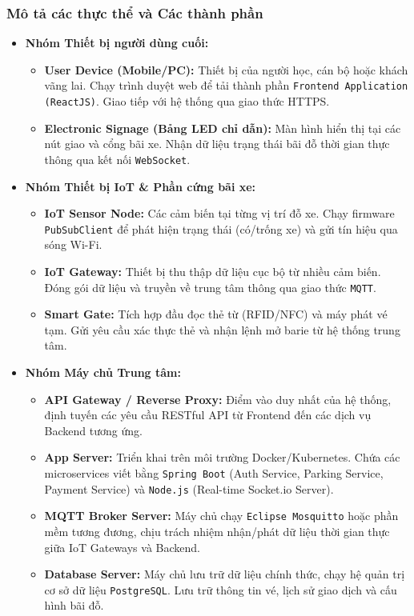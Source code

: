 \subsubsection{Mô tả các thực thể và Các thành phần}

\begin{itemize}
    \item \textbf{Nhóm Thiết bị người dùng cuối:}
    \begin{itemize}
        \item \textbf{User Device (Mobile/PC):} Thiết bị của người học, cán bộ hoặc khách vãng lai. Chạy trình duyệt web để tải thành phần \texttt{Frontend Application (ReactJS)}. Giao tiếp với hệ thống qua giao thức HTTPS.
        \item \textbf{Electronic Signage (Bảng LED chỉ dẫn):} Màn hình hiển thị tại các nút giao và cổng bãi xe. Nhận dữ liệu trạng thái bãi đỗ thời gian thực thông qua kết nối \texttt{WebSocket}.
    \end{itemize}

    \item \textbf{Nhóm Thiết bị IoT \& Phần cứng bãi xe:}
    \begin{itemize}
        \item \textbf{IoT Sensor Node:} Các cảm biến tại từng vị trí đỗ xe. Chạy firmware \texttt{PubSubClient} để phát hiện trạng thái (có/trống xe) và gửi tín hiệu qua sóng Wi-Fi.
        \item \textbf{IoT Gateway:} Thiết bị thu thập dữ liệu cục bộ từ nhiều cảm biến. Đóng gói dữ liệu và truyền về trung tâm thông qua giao thức \texttt{MQTT}.
        \item \textbf{Smart Gate:} Tích hợp đầu đọc thẻ từ (RFID/NFC) và máy phát vé tạm. Gửi yêu cầu xác thực thẻ và nhận lệnh mở barie từ hệ thống trung tâm.
    \end{itemize}

    \item \textbf{Nhóm Máy chủ Trung tâm:}
    \begin{itemize}
        \item \textbf{API Gateway / Reverse Proxy:} Điểm vào duy nhất của hệ thống, định tuyến các yêu cầu RESTful API từ Frontend đến các dịch vụ Backend tương ứng.
        \item \textbf{App Server:} Triển khai trên môi trường Docker/Kubernetes. Chứa các microservices viết bằng \texttt{Spring Boot} (Auth Service, Parking Service, Payment Service) và \texttt{Node.js} (Real-time Socket.io Server).
        \item \textbf{MQTT Broker Server:} Máy chủ chạy \texttt{Eclipse Mosquitto} hoặc phần mềm tương đương, chịu trách nhiệm nhận/phát dữ liệu thời gian thực giữa IoT Gateways và Backend.
        \item \textbf{Database Server:} Máy chủ lưu trữ dữ liệu chính thức, chạy hệ quản trị cơ sở dữ liệu \texttt{PostgreSQL}. Lưu trữ thông tin vé, lịch sử giao dịch và cấu hình bãi đỗ.
    \end{itemize}


\end{itemize}
